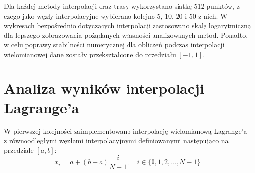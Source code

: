 \documentclass[a4paper,12pt]{article}
\begin{document}
  \begin{figure}[H]
    \centering
  \end{figure}
  \par Dla każdej metody interpolacji oraz trasy wykorzystano siatkę 512 punktów, z czego jako węzły interpolacyjne wybierano kolejno 5, 10, 20 i 50 z nich. W wykresach bezpośrednio dotyczących interpolacji zastosowano skalę logarytmiczną dla lepszego zobrazowania pożądanych własności analizowanych metod. Ponadto, w celu poprawy stabilności numerycznej dla obliczeń podczas interpolacji wielomianowej dane zostały przekształcone do przedziału $[-1, 1]$.
  
\section{Analiza wyników interpolacji Lagrange'a}
	W pierwszej kolejności zaimplementowano interpolację wielomianową Lagrange'a z równoodległymi węzłami interpolacyjnymi definiowanymi następująco na przedziale $[a, b]$:
		\begin{equation}
	x_i = a + (b-a)\frac{i}{N-1}, \quad i \in \{0, 1, 2, \dots, N-1\}
	\end{equation}
	
\end{document}
